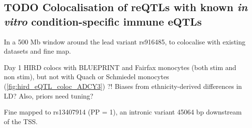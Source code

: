 \subsection{TODO Colocalisation of reQTLs with known \textit{in vitro} condition-specific immune eQTLs}

%
\begin{outline}

\1 In a 500 Mb window around the lead  variant rs916485,  to colocalise with existing datasets and fine map.

\1 Day 1 HIRD colocs with BLUEPRINT and Fairfax monocytes (both stim and non stim), but not with Quach or Schmiedel monocytes (\autoref{fig:hird_eQTL_coloc_ADCY3}) ?!
\2 Biases from ethnicity-derived differences in LD?
\2 Also, priors need tuning?

\1 Fine mapped to rs13407914 (PP = 1), an intronic variant 45064 bp downstream of the TSS.


\end{outline}

